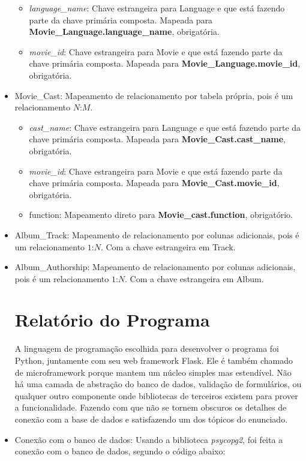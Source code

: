 \documentclass[a4paper, 11pt]{article}
\begin{document}
\begin{itemize}
\begin{itemize}
        \item {\textit{language\_name}}: Chave estrangeira para Language e que está fazendo parte da chave primária composta. Mapeada para {\textbf{Movie\_Language.language\_name}}, obrigatória.
        \item {\textit{movie\_id}}: Chave estrangeira para Movie e que está fazendo parte da chave primária composta. Mapeada para {\textbf{Movie\_Language.movie\_id}}, obrigatória.
    \end{itemize}
    \item Movie\_Cast: Mapeamento de relacionamento por tabela própria, pois é um relacionamento $N$:$M$.
    \begin{itemize}
        \item {\textit{cast\_name}}: Chave estrangeira para Language e que está fazendo parte da chave primária composta. Mapeada para {\textbf{Movie\_Cast.cast\_name}}, obrigatória.
        \item {\textit{movie\_id}}: Chave estrangeira para Movie e que está fazendo parte da chave primária composta. Mapeada para {\textbf{Movie\_Cast.movie\_id}}, obrigatória.
        \item function: Mapeamento direto para  {\textbf{Movie\_cast.function}}, obrigatório.
    \end{itemize}
    \item Album\_Track: Mapeamento de relacionamento por colunas adicionais, pois é um relacionamento $1$:$N$. Com a chave estrangeira em Track.
    \item Album\_Authorship: Mapeamento de relacionamento por colunas adicionais, pois é um relacionamento $1$:$N$. Com a chave estrangeira em Album.
    
    
\clearpage
\section*{Relatório do Programa}
A linguagem de programação escolhida para desenvolver o programa foi Python\cite{Python}, juntamente com seu web framework Flask\cite{Flask}. Ele é também chamado de microframework  porque mantem um núcleo simples mas estendível. Não há uma camada de abstração do banco de dados, validação de formulários, ou qualquer outro componente onde bibliotecas de terceiros existem para prover a funcionalidade. Fazendo com que não se tornem obscuros os detalhes de conexão com a base de dados e satisfazendo um dos tópicos do enunciado.

    \item Conexão com o banco de dados: Usando a biblioteca \textit{psycopg2}, foi feita a conexão com o banco de dados, segundo o código abaixo:


\end{itemize}
\end{document}
